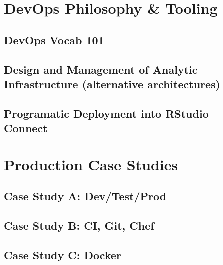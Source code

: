 \documentclass[]{book}
\begin{document}
\hypertarget{devops-philosophy-tooling}{%
\chapter{DevOps Philosophy \& Tooling}\label{devops-philosophy-tooling}}

\hypertarget{devops-vocab-101}{%
\section{DevOps Vocab 101}\label{devops-vocab-101}}

\hypertarget{design-and-management-of-analytic-infrastructure-alternative-architectures}{%
\section{Design and Management of Analytic Infrastructure (alternative
architectures)}\label{design-and-management-of-analytic-infrastructure-alternative-architectures}}

\hypertarget{programatic-deployment-into-rstudio-connect}{%
\section{Programatic Deployment into RStudio
Connect}\label{programatic-deployment-into-rstudio-connect}}

\hypertarget{production-case-studies}{%
\chapter{Production Case Studies}\label{production-case-studies}}

\hypertarget{case-study-a-devtestprod}{%
\section{Case Study A: Dev/Test/Prod}\label{case-study-a-devtestprod}}

\hypertarget{case-study-b-ci-git-chef}{%
\section{Case Study B: CI, Git, Chef}\label{case-study-b-ci-git-chef}}

\hypertarget{case-study-c-docker}{%
\section{Case Study C: Docker}\label{case-study-c-docker}}
\end{document}
